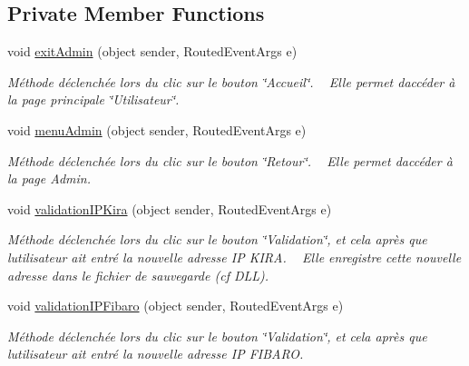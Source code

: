 \subsection*{Private Member Functions}
\begin{DoxyCompactItemize}
\item 
void \hyperlink{class_my_domotik_1_1_reglages_reseau_ac3106a07a35f5acf7b835968c7e6786f}{exit\+Admin} (object sender, Routed\+Event\+Args e)
\begin{DoxyCompactList}\small\item\em Méthode déclenchée lors du clic sur le bouton \char`\"{}\+Accueil\char`\"{}. ~\newline
Elle permet d\textquotesingle{}accéder à la page principale \char`\"{}\+Utilisateur\char`\"{}. \end{DoxyCompactList}\item 
void \hyperlink{class_my_domotik_1_1_reglages_reseau_a1fab3fc3cea90aaef2e16adbdb61294a}{menu\+Admin} (object sender, Routed\+Event\+Args e)
\begin{DoxyCompactList}\small\item\em Méthode déclenchée lors du clic sur le bouton \char`\"{}\+Retour\char`\"{}. ~\newline
Elle permet d\textquotesingle{}accéder à la page Admin. \end{DoxyCompactList}\item 
void \hyperlink{class_my_domotik_1_1_reglages_reseau_afcb9a7ae27270a4055daedd658e7aaff}{validation\+I\+P\+Kira} (object sender, Routed\+Event\+Args e)
\begin{DoxyCompactList}\small\item\em Méthode déclenchée lors du clic sur le bouton \char`\"{}\+Validation\char`\"{}, et cela après que l\textquotesingle{}utilisateur ait entré la nouvelle adresse IP K\+I\+RA. ~\newline
Elle enregistre cette nouvelle adresse dans le fichier de sauvegarde (cf D\+LL). \end{DoxyCompactList}\item 
void \hyperlink{class_my_domotik_1_1_reglages_reseau_acdda082cb32970fefeb68fa8e3b52e01}{validation\+I\+P\+Fibaro} (object sender, Routed\+Event\+Args e)
\begin{DoxyCompactList}\small\item\em Méthode déclenchée lors du clic sur le bouton \char`\"{}\+Validation\char`\"{}, et cela après que l\textquotesingle{}utilisateur ait entré la nouvelle adresse IP F\+I\+B\+A\+RO. ~\newline

\end{DoxyCompactList}
\end{DoxyCompactItemize}
